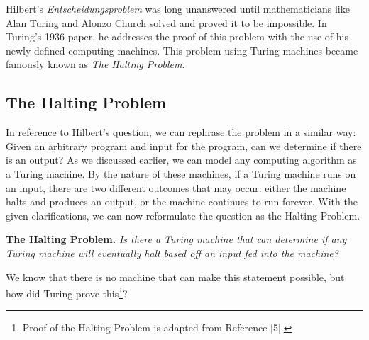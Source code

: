 \documentclass[11pt]{article}
\begin{document}
 Hilbert's \textit{Entscheidungsproblem} was long unanswered until mathematicians like Alan Turing and Alonzo Church solved and proved it to be impossible. In Turing's 1936 paper, he addresses the proof of this problem with the use of his newly defined computing machines. This problem using Turing machines became famously known as \textit{The Halting Problem}.

\subsection{The Halting Problem}

In reference to Hilbert's question, we can rephrase the problem in a similar way: Given an arbitrary program and input for the program, can we determine if there is an output? As we discussed earlier, we can model any computing algorithm as a Turing machine. By the nature of these machines, if a Turing machine runs on an input, there are two different outcomes that may occur: either the machine halts and produces an output, or the machine continues to run forever. With the given clarifications, we can now reformulate the question as the Halting Problem.\newline

\noindent \textbf{The Halting Problem.} \textit{Is there a Turing machine that can determine if any Turing machine will eventually halt based off an input fed into the machine?}\newline

\noindent We know that there is no machine that can make this statement possible, but how did Turing prove this\footnote{Proof of the Halting Problem is adapted from Reference [5].}?
\end{document}
